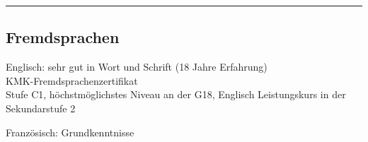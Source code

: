 \documentclass[10pt,letterpaper]{article}
\newenvironment{indentsection}[1]%
{\begin{list}{}%
	{\setlength{\leftmargin}{#1}}%
	\item[]%
}
{\end{list}}
\begin{document}
\hrule
\vspace{-0.4em}
\subsection*{Fremdsprachen}

\begin{indentsection}{\parindent}
\begin{description*}
  \item[Englisch:] sehr gut in Wort und Schrift (18 Jahre Erfahrung) \\ KMK-Fremdsprachenzertifikat \\ Stufe C1, höchstmöglichstes Niveau an der G18, 	Englisch Leistungskurs in der Sekundarstufe 2
  \item[Französisch:] Grundkenntnisse
\end{description*}
\end{indentsection}
\end{document}
